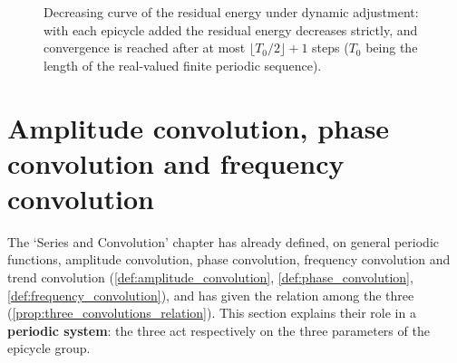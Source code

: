 \begin{figure}[htbp]
\centering
{}
\caption{Decreasing curve of the residual energy under dynamic adjustment: with each epicycle added the residual energy decreases strictly, and convergence is reached after at most $\lfloor T_0/2\rfloor+1$ steps ($T_0$ being the length of the real-valued finite periodic sequence).}
\label{fig:ps_adaptive_convergence}
\end{figure}

\section{Amplitude convolution, phase convolution and frequency convolution}\label{sec:ps_convolutions}

The `Series and Convolution' chapter has already defined, on general periodic functions, amplitude convolution, phase convolution, frequency convolution and trend convolution (\cref{def:amplitude_convolution}, \cref{def:phase_convolution}, \cref{def:frequency_convolution}), and has given the relation among the three (\cref{prop:three_convolutions_relation}). This section explains their role in a \textbf{periodic system}: the three act respectively on the three parameters of the epicycle group.


